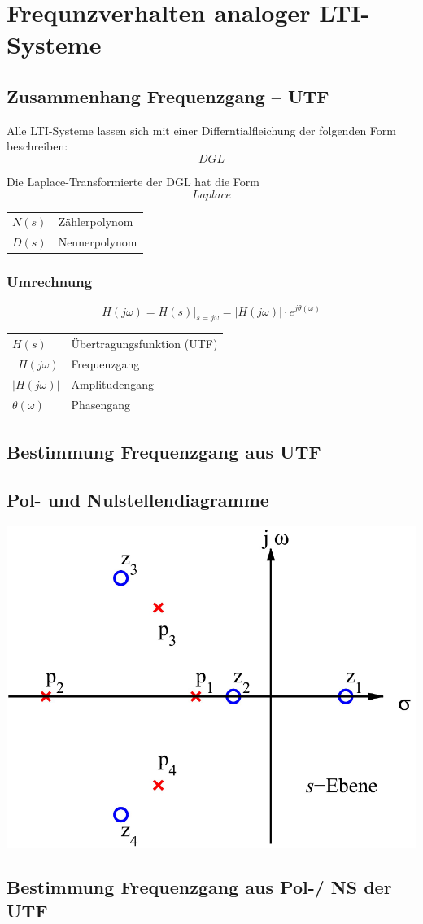 \section{Frequnzverhalten analoger LTI-Systeme}


\subsection{Zusammenhang Frequenzgang -- UTF}

Alle LTI-Systeme lassen sich mit einer Differntialfleichung der folgenden Form beschreiben:
$$ DGL $$

Die Laplace-Transformierte der DGL hat die Form 
$$ Laplace $$


\begin{tabular}{ll}
    $N(s)$ & Zählerpolynom \\
    $D(s)$ & Nennerpolynom 
\end{tabular}



\subsubsection{Umrechnung}

$$ \boxed{ H(j \omega) = H(s) \Big|_{s = j \omega}} = |H(j \omega)| \cdot e^{j \theta(\omega)} $$


\begin{tabular}{ll}
    $H(s)$          & Übertragungsfunktion (UTF) \\\
    $H(j \omega)$   & Frequenzgang \\
    $|H(j \omega)|$ & Amplitudengang \\
    $\theta(\omega)$& Phasengang
\end{tabular}


\subsection{Bestimmung Frequenzgang aus UTF}




\subsection{Pol- und Nulstellendiagramme}

\includegraphics[width=0.6\columnwidth]{images/pol_nullstellen_diagramm.png}



\subsection{Bestimmung Frequenzgang aus Pol-/ NS der UTF}


